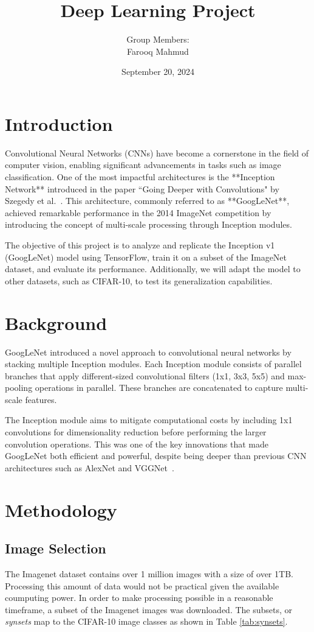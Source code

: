 \documentclass{article}
\title{Deep Learning Project}
\author{
    Group Members: \\
    Farooq Mahmud
}
\date{September 20, 2024}
\begin{document}
\maketitle

\section{Introduction}
Convolutional Neural Networks (CNNs) have become a cornerstone in the field of computer vision, enabling significant advancements in tasks such as image classification. One of the most impactful architectures is the **Inception Network** introduced in the paper ``Going Deeper with Convolutions" by Szegedy et al.~\cite{szegedy2015going}. This architecture, commonly referred to as **GoogLeNet**, achieved remarkable performance in the 2014 ImageNet competition by introducing the concept of multi-scale processing through Inception modules.

The objective of this project is to analyze and replicate the Inception v1 (GoogLeNet) model using TensorFlow, train it on a subset of the ImageNet dataset, and evaluate its performance. Additionally, we will adapt the model to other datasets, such as CIFAR-10, to test its generalization capabilities.


\section{Background}

GoogLeNet introduced a novel approach to convolutional neural networks by stacking multiple Inception modules. Each Inception module consists of parallel branches that apply different-sized convolutional filters (1x1, 3x3, 5x5) and max-pooling operations in parallel. These branches are concatenated to capture multi-scale features.

The Inception module aims to mitigate computational costs by including 1x1 convolutions for dimensionality reduction before performing the larger convolution operations. This was one of the key innovations that made GoogLeNet both efficient and powerful, despite being deeper than previous CNN architectures such as AlexNet and VGGNet~\cite{krizhevsky2012imagenet, simonyan2015vgg}.

\section{Methodology}

\subsection{Image Selection}
The Imagenet dataset contains over 1 million images with a size of over 1TB. Processing this amount of data would not be practical given the available coumputing power. In order to make processing possible in a reasonable timeframe, a subset of the Imagenet images was downloaded. The subsets, or \textit{synsets} map to the CIFAR-10 image classes as shown in Table \ref{tab:synsets}.
\end{document}
